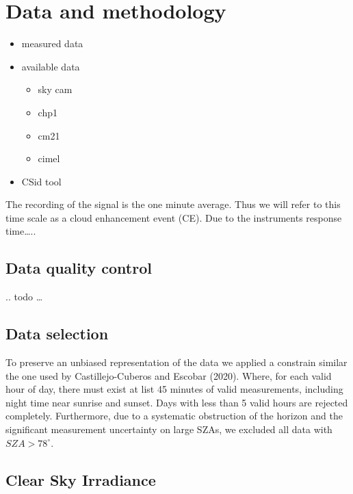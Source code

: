 \documentclass[
]{article}
\providecommand{\tightlist}{%
  \setlength{\itemsep}{0pt}\setlength{\parskip}{0pt}}
\begin{document}
\hypertarget{data-and-methodology}{%
\section{Data and methodology}\label{data-and-methodology}}

\begin{itemize}
\tightlist
\item
  measured data
\item
  available data

  \begin{itemize}
  \tightlist
  \item
    sky cam
  \item
    chp1
  \item
    cm21
  \item
    cimel
  \end{itemize}
\item
  CSid tool
\end{itemize}

The recording of the signal is the one minute average.
Thus we will refer to this time scale as a cloud enhancement event (CE).
Due to the instruments response time\ldots..

\hypertarget{data-quality-control}{%
\subsection{Data quality control}\label{data-quality-control}}

.. todo \ldots{}

\hypertarget{data-selection}{%
\subsection{Data selection}\label{data-selection}}

To preserve an unbiased representation of the data we applied a constrain similar the one used by Castillejo-Cuberos and Escobar (2020). Where, for each valid hour of day, there must exist at list 45 minutes of valid measurements, including night time near sunrise and sunset. Days with less than 5 valid hours are rejected completely. Furthermore, due to a systematic obstruction of the horizon and the significant measurement uncertainty on large SZAs, we excluded all data with \(SZA > 78^\circ\).

\hypertarget{clear-sky-irradiance}{%
\subsection{Clear Sky Irradiance}\label{clear-sky-irradiance}}
\end{document}

